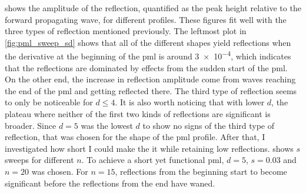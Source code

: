  shows the amplitude of the reflection,
quantified as the peak height relative to the forward propagating wave,
for different profiles.
These figures fit well with the three types of reflection mentioned previously.
The leftmost plot in \cref{fig:pml_sweep_sd} shows that all of the different
shapes yield reflections when the derivative at the beginning of the \gls{pml}
is around \num{3e-4}, which indicates that the reflections are dominated by
effects from the sudden start of the \gls{pml}.
On the other end, the increase in reflection amplitude come from
waves reaching the end of the \gls{pml} and getting reflected there.
The third type of reflection seems to only be noticeable for $d \leq 4$.
It is also worth noticing that with lower $d$, the plateau where neither of the
first two kinds of reflections are significant is broader.
Since $d=5$ was the lowest $d$ to show no signs of the third type of reflection,
that was chosen for the shape of the \gls{pml} profile.
After that, I investigated how short I could make the it while retaining
low reflections.  shows $s$ sweeps for different $n$.
To achieve a short yet functional \gls{pml}, $d=5$, $s=0.03$ and $n=20$ was
chosen.
For $n=15$, reflections from the beginning start to become significant before
the reflections from the end have waned.

